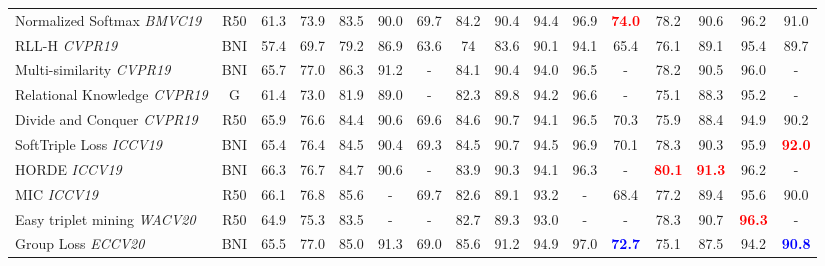 \documentclass{article}
\begin{document}
\begin{table*}
{\begin{tabular}{@{}l|c|ccccc|ccccc|cccc@{}}
Normalized Softmax \cite{DBLP:journals/corr/abs-1811-12649} \textit{BMVC19} & R50 & 61.3 & 73.9 & 83.5 & 90.0 & 69.7 &  84.2 & 90.4 & 94.4 & 96.9 & \textbf{\textcolor{red}{74.0}} & 78.2 & 90.6 & 96.2 & 91.0 \\

RLL-H  \cite{DBLP:conf/cvpr/WangHKHGR19} \textit{CVPR19} & BNI & 57.4 & 69.7 & 79.2 & 86.9 & 63.6 & 74 & 83.6 & 90.1 & 94.1 &   65.4 &   76.1 & 89.1 & 95.4 & 89.7 \\

Multi-similarity  \cite{DDBLP:conf/cvpr/Wand2019} \textit{CVPR19} & BNI & 65.7 & 77.0 & 86.3 & 91.2 & - &  84.1 & 90.4 & 94.0 & 96.5 & - & 78.2 & 90.5 & 96.0 & - \\ 

Relational Knowledge \cite{DBLP:conf/cvpr/Park2019} \textit{CVPR19} & G & 61.4 & 73.0 & 81.9 & 89.0 & - &  82.3 & 89.8 & 94.2 & 96.6 & - & 75.1 & 88.3 & 95.2  & -\\ 

Divide and Conquer  \cite{DDBLP:conf/cvpr/Sanakoyeu2019} \textit{CVPR19} & R50 & 65.9 & 76.6 & 84.4 & 90.6 & 69.6 & 84.6 & 90.7 & 94.1 & 96.5 &  70.3 &   75.9   & 88.4 & 94.9 &90.2 \\ 



SoftTriple Loss \cite{DBLP:journals/corr/abs-1909-05235} \textit{ICCV19} & BNI & 65.4 & 76.4 & 84.5 & 90.4 & 69.3 & 84.5 & 90.7 & 94.5 & 96.9 & 70.1 & 78.3 & 90.3 & 95.9 & \textbf{\textcolor{red}{92.0}} \\

HORDE \cite{DBLP:journals/corr/abs-1908-02735} \textit{ICCV19} & BNI & 66.3 & 76.7 & 84.7 & 90.6 & -  & 83.9 & 90.3 & 94.1 & 96.3 & -  & \textbf{\textcolor{red}{80.1}} & \textbf{\textcolor{red}{91.3}} & 96.2 & -\\

MIC \cite{DBLP:conf/iccv/BrattoliRO19} \textit{ICCV19} & R50 & 66.1 & 76.8 & 85.6 & - & 69.7 & 82.6 & 89.1 & 93.2 & - & 68.4 & 77.2 & 89.4 & 95.6 & 90.0  \\

Easy triplet mining \cite{DBLP:conf/wacv/XuanSP20} \textit{WACV20} & R50 & 64.9 & 75.3 & 83.5 & - & - & 82.7 & 89.3 & 93.0 & - & - & 78.3 & 90.7 & \textbf{\textcolor{red}{96.3}} & - \\   

Group Loss \cite{DBLP:conf/eccv/GrLoss} \textit{ECCV20} & BNI & 65.5 & 77.0 & 85.0 & 91.3 & 69.0 & 85.6 & 91.2 & 94.9 & 97.0 & \textbf{\textcolor{blue}{72.7}} & 75.1 & 87.5 & 94.2 & \textbf{\textcolor{blue}{90.8}} \\


\end{tabular}}
\end{table*}
\end{document}
